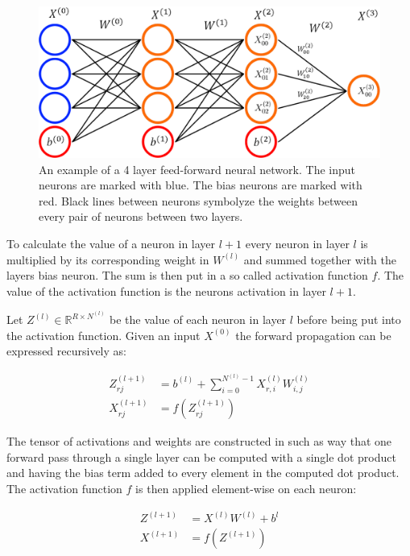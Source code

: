 \documentclass[a4paper,11pt,twoside]{article}
\begin{document}
\begin{figure}[h]
	\centering
  		\includegraphics[scale=0.4]{FCC.png}
  	\caption{An example of a 4 layer feed-forward neural network. The input neurons are marked with blue. The bias neurons are marked with red. Black lines between neurons symbolyze the weights between every pair of neurons between two layers.} \label{figFCCmath}
\end{figure}

To calculate the value of a neuron in layer $l+1$ every neuron in layer $l$ is multiplied by its corresponding weight in $W^{(l)}$ and summed together with the layers bias neuron. The sum is then put in a so called activation function $f$. The value of the activation function is the neurons activation in layer $l+1$. \cite{cs231n} \cite{wikiStanford}

Let $Z^{(l)} \in \mathbb{R}^{R \times N^{(l)}}$ be the value of each neuron in layer $l$ before being put into the activation function. Given an input $X^{(0)}$ the forward propagation can be expressed recursively as: \cite{cs231n} \cite{wikiStanford}

\begin{align}
Z_{rj}^{(l+1)} & = b^{(l)} + \sum^{N^{(l)}-1}_{i = 0} X^{(l)}_{r,i} W^{(l)}_{i,j}\\
X_{rj}^{(l+1)} & = f(Z_{rj}^{(l+1)})
\end{align}

The tensor of activations and weights are constructed in such as way that one forward pass through a single layer can be computed with a single dot product and having the bias term added to every element in the computed dot product. The activation function $f$ is then applied element-wise on each neuron: \cite{cs231n} \cite{wikiStanford}

\begin{align}
Z^{(l+1)} & = X^{(l)}W^{(l)}+b^{l}\\
X^{(l+1)} & = f(Z^{(l+1)})
\end{align}
\end{document}
